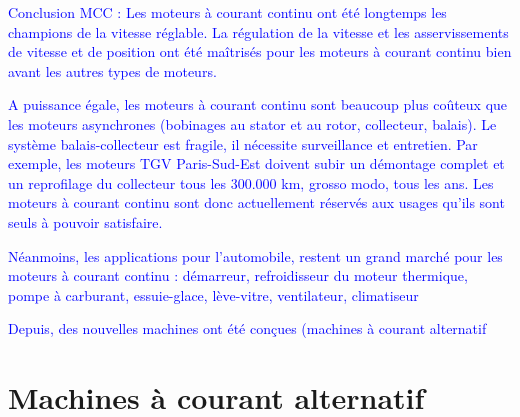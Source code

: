 \documentclass{article}
\begin{document}
\textcolor{blue}{Conclusion MCC : Les moteurs à courant continu ont été longtemps les champions de la vitesse réglable. La régulation de la vitesse et les asservissements de vitesse et de position ont été maîtrisés pour les moteurs à courant continu bien avant les autres types de moteurs.}\medskip

\textcolor{blue}{A puissance égale, les moteurs à courant continu sont beaucoup plus coûteux que les moteurs asynchrones (bobinages au stator et au rotor, collecteur, balais). Le système balais-collecteur est fragile, il nécessite surveillance et entretien. Par exemple, les moteurs TGV Paris-Sud-Est doivent subir un démontage complet et un reprofilage du collecteur tous les $300.000$ km, grosso modo, tous les ans. Les moteurs à courant continu sont donc actuellement réservés aux usages qu'ils sont seuls à pouvoir satisfaire.}\medskip

\textcolor{blue}{Néanmoins, les applications pour l'automobile, restent un grand marché pour les moteurs à courant continu : démarreur, refroidisseur du moteur thermique, pompe à carburant, essuie-glace, lève-vitre, ventilateur, climatiseur}\medskip

\textcolor{blue}{Depuis, des nouvelles machines ont été conçues (machines à courant alternatif}



\section{Machines à courant alternatif}


\end{document}
